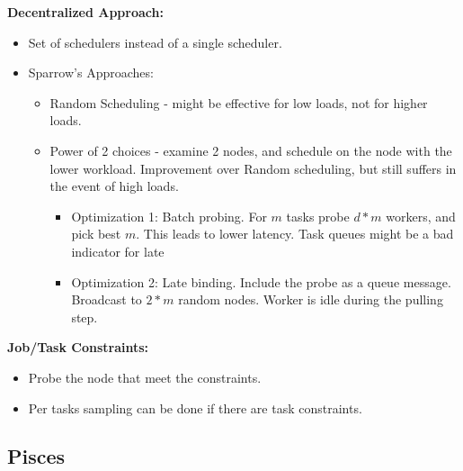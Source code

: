 \documentclass[parskip=half]{scrartcl}
\begin{document}
        \textbf{Decentralized Approach:}\\
        \begin{itemize}
            \item 
            Set of schedulers instead of a single scheduler.
            \item 
            Sparrow's Approaches:
            \begin{itemize}
                \item 
                Random Scheduling - might be effective for low loads, not for higher loads.
                \item 
                Power of 2 choices -  examine 2 nodes, and schedule on the node with the lower workload. Improvement over Random scheduling, but still suffers in the event of high loads.
                \begin{itemize}
                    \item 
                    Optimization 1: Batch probing. For $m$ tasks probe $d*m$ workers, and pick best $m$. This leads to lower latency. 
                    Task queues might be a bad indicator for late
                    \item 
                    Optimization 2: Late binding. Include the probe as a queue message. Broadcast to $2*m$ random nodes. Worker is idle during the pulling step.
                \end{itemize}
            \end{itemize}
        \end{itemize}

        \textbf{Job/Task Constraints:}\\
        \begin{itemize}
            \item 
            Probe the node that meet the constraints.
            \item 
            Per tasks sampling can be done if there are task constraints.
        \end{itemize}


    \subsection{Pisces} %
    \label{sub:pisces}
\end{document}
